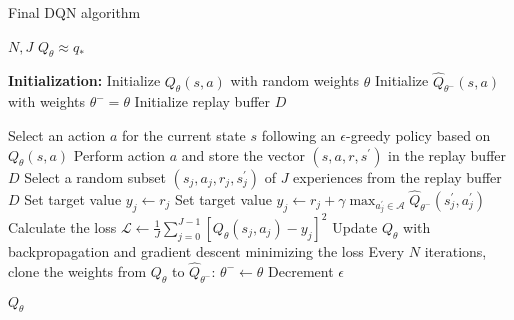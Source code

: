 \begin{algorithm}
\caption{Final DQN algorithm}
\label{alg:dqn2}
\begin{algorithmic}
    \REQUIRE $N, J$
    \ENSURE $Q_\theta \approx q_*$
    \STATE

    \STATE \textbf{Initialization:}
    \STATE Initialize $Q_\theta(s,a)$ with random weights $\theta$
    \STATE Initialize $\hat{Q}_{\theta^-}(s,a)$ with weights $\theta^- = \theta$
    \STATE Initialize replay buffer $D$
    \STATE
    
            \STATE Select an action $a$ for the current state $s$ following an $\epsilon$-greedy policy based on $Q_\theta(s,a)$
            \STATE Perform action $a$ and store the vector $(s,a,r,s^\prime)$ in the replay buffer $D$
            \STATE Select a random subset $(s_j,a_j,r_j,s^\prime_j)$ of $J$ experiences from the replay buffer $D$
                    \STATE Set target value $y_j \gets r_j$
                \ELSE
                    \STATE Set target value $y_j \gets r_j + \gamma \max_{a^\prime_j \in \mathcal{A}} \hat{Q}_{\theta^-}(s^\prime_j,a^\prime_j)$
                \ENDIF
            \ENDFOR
            \STATE Calculate the loss $\mathcal{L} \gets \frac{1}{J} \sum^{J-1}_{j=0} [Q_\theta(s_j,a_j) - y_j]^2$
            \STATE Update $Q_\theta$ with backpropagation and gradient descent minimizing the loss
            \STATE Every $N$ iterations, clone the weights from $Q_\theta$ to $\hat{Q}_{\theta^-}$: $\theta^- \gets \theta$
            \STATE Decrement $\epsilon$
        \ENDFOR
    \ENDFOR
    \STATE

    \RETURN $Q_\theta$
\end{algorithmic}
\end{algorithm}